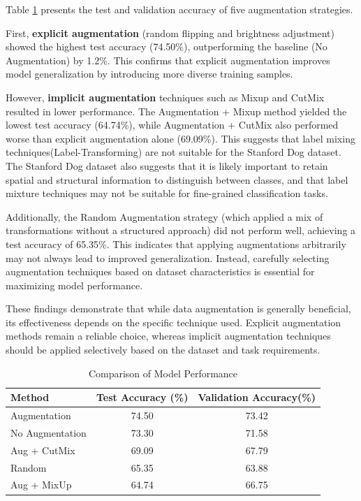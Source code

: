 \documentclass{article}
\begin{document}
Table \ref{model-performance} presents the test and validation accuracy of five augmentation strategies.

First, {\bf explicit augmentation} (random flipping and brightness adjustment) showed the highest test accuracy (74.50\%), outperforming the baseline (No Augmentation) by 1.2\%. This confirms that explicit augmentation improves model generalization by introducing more diverse training samples.

However, {\bf implicit augmentation} techniques such as Mixup and CutMix resulted in lower performance. The Augmentation + Mixup method yielded the lowest test accuracy (64.74\%), while Augmentation + CutMix also performed worse than explicit augmentation alone (69.09\%).  This suggests that label mixing techniques(Label-Transforming) are not suitable for the Stanford Dog dataset. The Stanford Dog dataset also suggests that it is likely important to retain spatial and structural information to distinguish between classes, and that label mixture techniques may not be suitable for fine-grained classification tasks.

Additionally, the Random Augmentation strategy (which applied a mix of transformations without a structured approach) did not perform well, achieving a test accuracy of 65.35\%. This indicates that applying augmentations arbitrarily may not always lead to improved generalization. Instead, carefully selecting augmentation techniques based on dataset characteristics is essential for maximizing model performance.

These findings demonstrate that while data augmentation is generally beneficial, its effectiveness depends on the specific technique used. Explicit augmentation methods remain a reliable choice, whereas implicit augmentation techniques should be applied selectively based on the dataset and task requirements.



\begin{table}[h]
  \caption{Comparison of Model Performance}
  \label{model-performance}
  \centering
  \begin{tabular}{lcc}
    \toprule
    Method              & Test Accuracy (\%) & Validation Accuracy(\%) \\
    \midrule
    Augmentation        & 74.50         & 73.42            \\
    No Augmentation     & 73.30         & 71.58            \\
    Aug + CutMix        & 69.09         & 67.79            \\
    Random              & 65.35         & 63.88            \\
    Aug + MixUp         & 64.74         & 66.75            \\
    \bottomrule
  \end{tabular}
\end{table}
\end{document}
